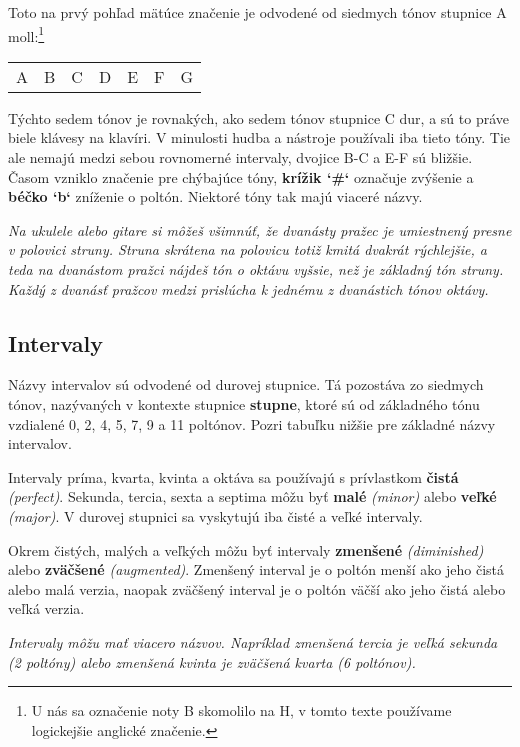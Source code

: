 Toto na prvý pohľad mätúce značenie je odvodené od siedmych tónov stupnice A moll:\footnote{U nás sa označenie noty B skomolilo na H, v tomto texte používame logickejšie anglické značenie.}

\begin{center}
\begin{tabular}{ C{2em} C{2em} C{2em} C{2em} C{2em} C{2em} C{2em} }
    A & B & C & D & E & F & G \\
\end{tabular}
\end{center}

Týchto sedem tónov je rovnakých, ako sedem tónov stupnice C dur, a sú to práve biele klávesy na klavíri.
V minulosti hudba a nástroje používali iba tieto tóny. Tie ale nemajú medzi sebou rovnomerné
intervaly, dvojice B-C a E-F sú bližšie. Časom vzniklo značenie pre chýbajúce tóny,
\textbf{krížik `\#`} označuje zvýšenie a \textbf{béčko `b`} zníženie o poltón. Niektoré tóny tak majú
viaceré názvy.

\textit{%
Na ukulele alebo gitare si môžeš všimnúť, že dvanásty pražec je umiestnený presne v polovici struny.
Struna skrátena na polovicu totiž kmitá dvakrát rýchlejšie, a teda na dvanástom pražci nájdeš tón
o oktávu vyšsie, než je základný tón struny. Každý z dvanásť pražcov medzi prislúcha k jednému
z dvanástich tónov oktávy.
}


\subsection*{Intervaly}

Názvy intervalov sú odvodené od durovej stupnice. Tá pozostáva zo siedmych tónov, nazývaných
v kontexte stupnice \textbf{stupne}, ktoré sú od základného tónu vzdialené 0, 2, 4, 5, 7, 9 a 11
poltónov. Pozri tabuľku nižšie pre základné názvy intervalov.

Intervaly príma, kvarta, kvinta a oktáva sa používajú s prívlastkom \textbf{čistá} \textit{(perfect)}.
Sekunda, tercia, sexta a septima môžu byť \textbf{malé} \textit{(minor)} alebo \textbf{veľké}
\textit{(major)}. V durovej stupnici sa vyskytujú iba čisté a veľké intervaly.

Okrem čistých, malých a veľkých môžu byť intervaly \textbf{zmenšené} \textit{(diminished)} alebo
\textbf{zväčšené} \textit{(augmented)}. Zmenšený interval je o poltón menší ako jeho čistá alebo
malá verzia, naopak zväčšený interval je o poltón väčší ako jeho čistá alebo veľká verzia.

\textit{%
Intervaly môžu mať viacero názvov. Napríklad zmenšená tercia je veľká sekunda (2 poltóny) alebo
zmenšená kvinta je zväčšená kvarta (6 poltónov).
}



